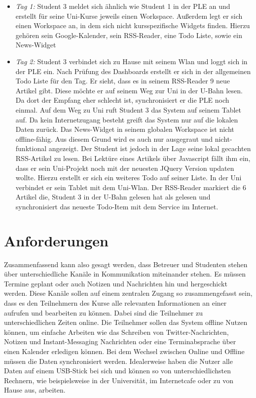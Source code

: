 \begin{itemize}
 \item \emph{Tag 1:} Student 3 meldet sich ähnlich wie Student 1 in der PLE an und erstellt für seine Uni-Kurse jeweils einen Workspace. Außerdem legt er sich einen Workspace an, in dem sich nicht kursspezifische Widgets finden. Hierzu gehören sein Google-Kalender, sein RSS-Reader, eine Todo Liste, sowie ein News-Widget
 \item \emph{Tag 2:} Student 3 verbindet sich zu Hause mit seinem Wlan und loggt sich in der PLE ein. Nach Prüfung des Dashboards erstellt er sich in der allgemeinen Todo Liste für den Tag. Er sieht, dass es in seinem RSS-Reader 9 neue Artikel gibt. Diese möchte er auf seinem Weg zur Uni in der U-Bahn lesen. Da dort der Empfang eher schlecht ist, synchronisiert er die PLE noch einmal. Auf dem Weg zu Uni ruft Student 3 das System auf seinem Tablet auf. Da kein Internetzugang besteht greift das System nur auf die lokalen Daten zurück. Das News-Widget in seinem globalen Workspace ist nicht offline-fähig. Aus diesem Grund wird es auch nur ausgegraut und nicht-funktional angezeigt. Der Student ist jedoch in der Lage seine lokal gecachten RSS-Artikel zu lesen. Bei Lektüre eines Artikels über Javascript fällt ihm ein, dass er sein Uni-Projekt noch mit der neuesten JQuery Version updaten wollte. Hierzu erstellt er sich ein weiteres Todo auf seiner Liste.
 In der Uni verbindet er sein Tablet mit dem Uni-Wlan. Der RSS-Reader markiert die 6 Artikel die, Student 3 in der U-Bahn gelesen hat als gelesen und synchronisiert das neueste Todo-Item mit dem Service im Internet.  
\end{itemize}

\section{Anforderungen}\label{section:anforderungen_summary}
Zusammenfassend kann also gesagt werden, dass Betreuer und Studenten stehen über unterschiedliche Kanäle in Kommunikation miteinander stehen. Es müssen Termine geplant oder auch Notizen und Nachrichten hin und hergeschickt werden. Diese Kanäle sollen auf einem zentralen Zugang so zusammengefasst sein, dass es den Teilnehmern des Kurse alle relevanten Informationen an einer aufrufen und bearbeiten zu können. Dabei sind die Teilnehmer zu unterschiedlichen Zeiten online. Die Teilnehmer sollen das System offline Nutzen können, um einfache Arbeiten wie das Schreiben von Twitter-Nachrichten, Notizen und Instant-Messaging Nachrichten oder eine Terminabsprache über einen Kalender erledigen können. Bei dem Wechsel zwischen Online und Offline müssen die Daten synchronisiert werden. Idealerweise haben die Nutzer alle Daten auf einem USB-Stick bei sich und können so von unterschiedlichsten Rechnern, wie beispielsweise in der Universität, im Internetcafe oder zu von Hause aus, arbeiten.

